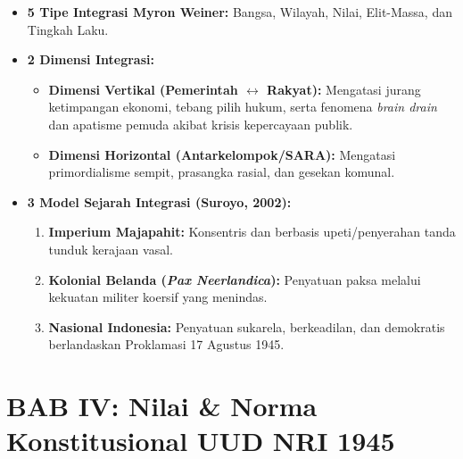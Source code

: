 \documentclass[10pt,a4paper]{article}
\begin{document}
\begin{conceptbox}
\begin{itemize}
  \item \textbf{5 Tipe Integrasi Myron Weiner:} Bangsa, Wilayah, Nilai, Elit-Massa, dan Tingkah Laku.
  \item \textbf{2 Dimensi Integrasi:}
  \begin{itemize}
    \item \textbf{Dimensi Vertikal (Pemerintah $\leftrightarrow$ Rakyat):} Mengatasi jurang ketimpangan ekonomi, tebang pilih hukum, serta fenomena \textit{brain drain} dan apatisme pemuda akibat krisis kepercayaan publik.
    \item \textbf{Dimensi Horizontal (Antarkelompok/SARA):} Mengatasi primordialisme sempit, prasangka rasial, dan gesekan komunal.
  \end{itemize}
  \item \textbf{3 Model Sejarah Integrasi (Suroyo, 2002):}
  \begin{enumerate}
    \item \textbf{Imperium Majapahit:} Konsentris dan berbasis upeti/penyerahan tanda tunduk kerajaan vasal.
    \item \textbf{Kolonial Belanda (\textit{Pax Neerlandica}):} Penyatuan paksa melalui kekuatan militer koersif yang menindas.
    \item \textbf{Nasional Indonesia:} Penyatuan sukarela, berkeadilan, dan demokratis berlandaskan Proklamasi 17 Agustus 1945.
  \end{enumerate}
\end{itemize}
\end{conceptbox}

\section*{BAB IV: Nilai \& Norma Konstitusional UUD NRI 1945}
\end{document}
